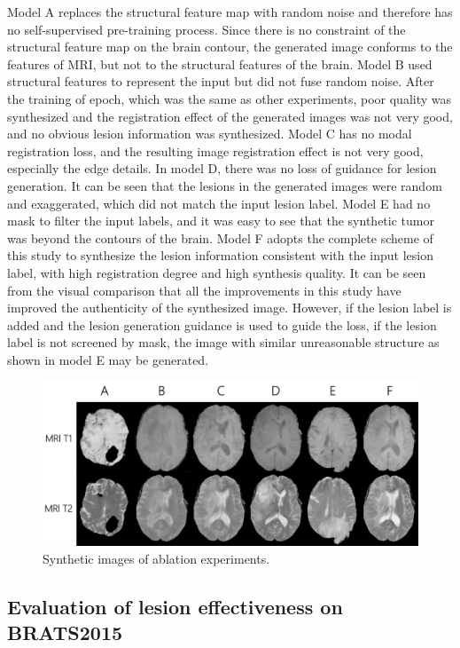 \documentclass[runningheads]{llncs}
\begin{document}
Model A replaces the structural feature map with random noise and therefore has no self-supervised pre-training process. Since there is no constraint of the structural feature map on the brain contour, the generated image conforms to the features of MRI, but not to the structural features of the brain. Model B used structural features to represent the input but did not fuse random noise. After the training of epoch, which was the same as other experiments, poor quality was synthesized and the registration effect of the generated images was not very good, and no obvious lesion information was synthesized. Model C has no modal registration loss, and the resulting image registration effect is not very good, especially the edge details. In model D, there was no loss of guidance for lesion generation. It can be seen that the lesions in the generated images were random and exaggerated, which did not match the input lesion label. Model E had no mask to filter the input labels, and it was easy to see that the synthetic tumor was beyond the contours of the brain. Model F adopts the complete scheme of this study to synthesize the lesion information consistent with the input lesion label, with high registration degree and high synthesis quality. It can be seen from the visual comparison that all the improvements in this study have improved the authenticity of the synthesized image. However, if the lesion label is added and the lesion generation guidance is used to guide the loss, if the lesion label is not screened by mask, the image with similar unreasonable structure as shown in model E may be generated.
\begin{figure}
	\centering
	\includegraphics[width=0.67\linewidth]{figures/ablation}
	\caption{Synthetic images of ablation experiments.}
	\label{ablation}
\end{figure}

\subsection{Evaluation of lesion effectiveness on BRATS2015}
\label{label gen methods tests}
\end{document}
